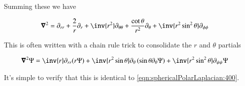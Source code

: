 Summing these we have

\begin{align}\label{eqn:sphericalPolarLaplacian:400}
\spacegrad^2 &=
\partial_{rr}
+ \frac{2}{r} \partial_r
+\inv{r^2} \partial_{\theta\theta}
+ \frac{\cot\theta}{r^2}\partial_\theta
+ \inv{r^2 \sin^2\theta} \partial_{\phi\phi}
\end{align}

This is often written with a chain rule trick to consolidate the $r$ and $\theta$ partials

\begin{align}\label{eqn:sphericalPolarLaplacian:401}
\spacegrad^2 \Psi &=
\inv{r} \partial_{rr} (r \Psi)
+ \inv{r^2 \sin\theta} \partial_\theta \left( \sin\theta \partial_\theta \Psi \right)
+ \inv{r^2 \sin^2\theta} \partial_{\psi\psi} \Psi
\end{align}

It's simple to verify that this is identical to \ref{eqn:sphericalPolarLaplacian:400}.

\EndArticle
